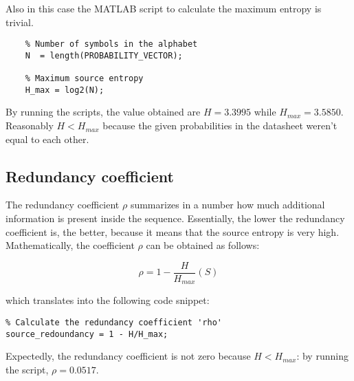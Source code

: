 \noindent Also in this case the MATLAB script to calculate the maximum entropy is trivial.

\begin{lstlisting}
    % Number of symbols in the alphabet
    N  = length(PROBABILITY_VECTOR);

    % Maximum source entropy
    H_max = log2(N);
\end{lstlisting}

\noindent By running the scripts, the value obtained are $H = 3.3995$ while $H_{max} = 3.5850$. Reasonably $H < H_{max}$ because the given probabilities in the datasheet weren't equal to each other.

% 
\subsection{Redundancy coefficient}

The redundancy coefficient $\rho$ summarizes in a number how much additional information is present inside the sequence. Essentially, the lower the redundancy coefficient is, the better, because it means that the source entropy is very high. Mathematically, the coefficient $\rho$ can be obtained as follows:

\begin{equation*}
    \rho = 1 - \frac{H}{H_{max}}(S)    
\end{equation*}

\noindent which translates into the following code snippet:

\begin{lstlisting}
% Calculate the redundancy coefficient 'rho'
source_redoundancy = 1 - H/H_max;
\end{lstlisting}

\noindent Expectedly, the redundancy coefficient is not zero because $H<H_{max}$: by running the script, $\rho = 0.0517$.



